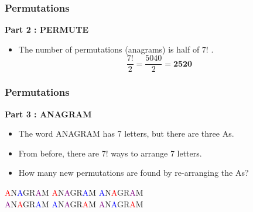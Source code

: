 \documentclass[]{report}
\begin{document}
\begin{frame}
\frametitle{Permutations}
\Large
\vspace{-0.3cm}
\textbf{Part 2 : PERMUTE}\\
\begin{itemize}
\item The number of permutations (anagrams) is half of 7! .
\LARGE
\[\frac{7!}{2} =  \frac{5040}{2} = \boldsymbol{2520} \]
\end{itemize}
\end{frame}

\begin{frame}
\frametitle{Permutations}
\Large
\vspace{-0.1cm}
\textbf{Part 3 : ANAGRAM}\\
\begin{itemize}
\item The word ANAGRAM has 7 letters, but there are three As.
\item From before, there are 7! ways to arrange 7 letters.
\item How many new permutations are found by re-arranging the As?
\end{itemize}
\LARGE
\begin{center}
\textcolor{red}{A}N\textcolor{blue}{A}GR\textcolor{purple}{A}M \; 
\textcolor{red}{A}N\textcolor{purple}{A}GR\textcolor{blue}{A}M \; 
\textcolor{blue}{A}N\textcolor{red}{A}GR\textcolor{purple}{A}M \; \\
\textcolor{purple}{A}N\textcolor{red}{A}GR\textcolor{blue}{A}M \; 
\textcolor{blue}{A}N\textcolor{purple}{A}GR\textcolor{red}{A}M \; 
\textcolor{purple}{A}N\textcolor{blue}{A}GR\textcolor{red}{A}M \; 
\end{center}
\end{frame}
\end{document}
